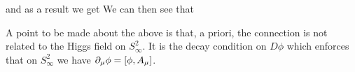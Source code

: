 \documentclass{article}
\begin{document}
\begin{enumerate}
and as a result we get 
We can then see that 
\end{enumerate} 
\begin{remark}
	A point to be made about the above is that, a priori, the connection is not related to the Higgs field on $S_\infty^2$. It is the decay condition on $D\phi$ which enforces that on $S_\infty^2$ we have $\del_\mu \phi = \comm[\phi]{A_\mu}$.
\end{remark}
\end{document}
